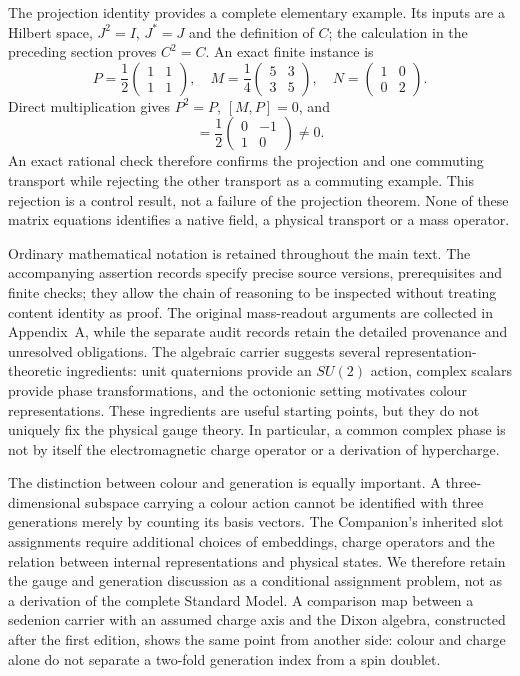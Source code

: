 The projection identity provides a complete elementary example. Its
inputs are a Hilbert space, $J^2=I$, $J^*=J$ and the definition of $C$;
the calculation in the preceding section proves $C^2=C$. An exact
finite instance is
\begin{equation}
 P=\frac12\begin{pmatrix}1&1\\1&1\end{pmatrix},\quad
 M=\frac14\begin{pmatrix}5&3\\3&5\end{pmatrix},\quad
 N=\begin{pmatrix}1&0\\0&2\end{pmatrix}.
\end{equation}
Direct multiplication gives $P^2=P$, $[M,P]=0$, and
\begin{equation}
 [N,P]=\frac12\begin{pmatrix}0&-1\\1&0\end{pmatrix}\ne0.
\end{equation}
An exact rational check therefore confirms the projection and one
commuting transport while rejecting the other transport as a commuting
example. This rejection is a control result, not a failure of the
projection theorem. None of these matrix equations identifies a native
field, a physical transport or a mass operator.

Ordinary mathematical notation is retained throughout the main text.
The accompanying assertion records specify precise source versions,
prerequisites and finite checks; they allow the chain of reasoning to
be inspected without treating content identity as proof. The original
mass-readout arguments are collected in Appendix~A, while the separate
audit records retain the detailed provenance and unresolved obligations.
The algebraic carrier suggests several representation-theoretic
ingredients: unit quaternions provide an $SU(2)$ action, complex scalars
provide phase transformations, and the octonionic setting motivates
colour representations. These ingredients are useful starting points,
but they do not uniquely fix the physical gauge theory. In particular,
a common complex phase is not by itself the electromagnetic charge
operator or a derivation of hypercharge.

The distinction between colour and generation is equally important.
A three-dimensional subspace carrying a colour action cannot be
identified with three generations merely by counting its basis vectors.
The Companion's inherited slot assignments require additional choices
of embeddings, charge operators and the relation between internal
representations and physical states. We therefore retain the gauge and
generation discussion as a conditional assignment problem, not as a
derivation of the complete Standard Model. A comparison map between
a sedenion carrier with an assumed charge axis and the Dixon algebra,
constructed after the first edition, shows the same point from another
side: colour and charge alone do not separate a two-fold generation
index from a spin doublet.

